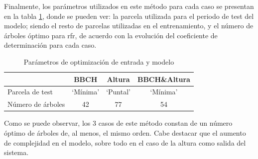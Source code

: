 \par Finalmente, los parámetros utilizados en este método para cada caso se presentan en la tabla \ref{tab:opt_parcl}, donde se pueden ver: la parcela utilizada para el periodo de test del modelo; siendo el resto de parcelas utilizadas en el entrenamiento, y el número de árboles óptimo para \gls{rfr}, de acuerdo con la evolución del coeficiente de determinación para cada caso.

\begin{table}[h]
\centering
\begin{tabular}{l|ccc}
                  & BBCH     & Altura   & BBCH\&Altura \\ \hline
Parcela de test   & `Mínima' & `Puntal' & `Mínima'     \\
Número de árboles & 42       & 77       & 54          
\end{tabular}
\caption{Parámetros de optimización de entrada y modelo
\label{tab:opt_parcl}}
\end{table}

\par Como se puede observar, los 3 casos de este método constan de un número óptimo de árboles de, al menos, el mismo orden. Cabe destacar que el aumento de complejidad en el modelo, sobre todo en el caso de la altura como salida del sistema.  
